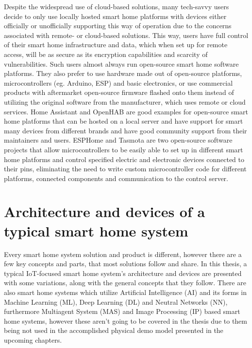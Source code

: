 Despite the widespread use of cloud-based solutions, many tech-savvy users decide to only use locally hosted smart home platforms with devices either officially or unofficially supporting this way of operation due to the concerns associated with remote- or cloud-based solutions. This way, users have full control of their smart home infrastructure and data, which when set up for remote access, will be as secure as its encryption capabilities and scarcity of vulnerabilities. Such users almost always run open-source smart home software platforms. They also prefer to use hardware made out of open-source platforms, microcontrollers (eg. Arduino, ESP) and basic electronics, or use commercial products with aftermarket open-source firmware flashed onto them instead of utilizing the original software from the manufacturer, which uses remote or cloud services. Home Assistant and OpenHAB are good examples for open-source smart home platforms that can be hosted on a local server and have support for smart many devices from different brands and have good community support from their maintainers and users. \cite{HAHomepage} \cite{openHABHomepage} ESPHome and Tasmota are two open-source software projects that allow microcontrollers to be easily able to set up in different smart home platforms and control specified electric and electronic devices connected to their pins, eliminating the need to write custom microcontroller code for different platforms, connected components and communication to the control server. \cite{ESPHomeHomepage} \cite{TasmotaHomepage}

\section{Architecture and devices of a typical smart home system}

Every smart home system solution and product is different, however there are a few key concepts and parts, that most solutions follow and share. In this thesis, a typical IoT-focused smart home system's architecture and devices are presented with some variations, along with the general concepts that they follow. There are also smart home systems which utilize Artificial Intelligence (AI) and its forms in Machine Learning (ML), Deep Learning (DL) and Neutral Networks (NN), furthermore Multiagent System (MAS) and Image Processing (IP) based smart home systems, however these aren't going to be covered in the thesis due to them being not used in the accomplished physical demo model presented in the upcoming chapters. \cite{ChakSHS}

